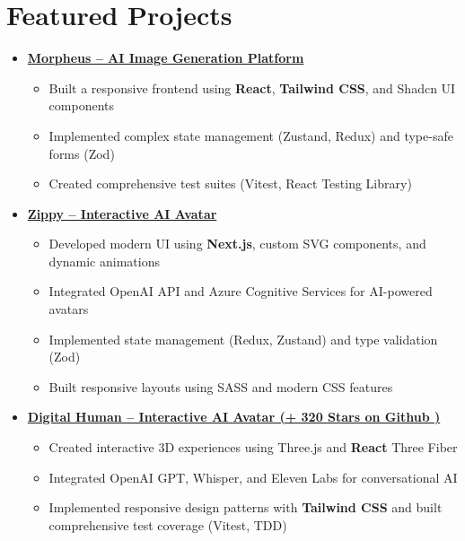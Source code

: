 \documentclass[letterpaper,11pt]{article}
\newcommand{\normalfaExternalLink}{{\mdseries\faExternalLink}}
\begin{document}
\section{Featured Projects}
\begin{itemize}[leftmargin=*]
    \item \textbf{\href{https://github.com/Monadical-SAS/Morpheus}{Morpheus -- AI Image Generation Platform \normalfaExternalLink}}
    \begin{itemize}
        \item Built a responsive frontend using \textbf{React}, \textbf{Tailwind CSS}, and Shadcn UI components
        \item Implemented complex state management (Zustand, Redux) and type-safe forms (Zod)
        \item Created comprehensive test suites (Vitest, React Testing Library)
    \end{itemize}
    
    \item \textbf{\href{https://github.com/asanchezyali/ai-avatar}{Zippy -- Interactive AI Avatar \normalfaExternalLink}}
    \begin{itemize}
        \item Developed modern UI using \textbf{Next.js}, custom SVG components, and dynamic animations
        \item Integrated OpenAI API and Azure Cognitive Services for AI-powered avatars
        \item Implemented state management (Redux, Zustand) and type validation (Zod)
        \item Built responsive layouts using SASS and modern CSS features
    \end{itemize}

    \item \textbf{\href{https://github.com/asanchezyali/talking-avatar-with-ai}{Digital Human -- Interactive AI Avatar (+
        320 Stars on Github )\normalfaExternalLink}}
    \begin{itemize}
        \item Created interactive 3D experiences using Three.js and \textbf{React} Three Fiber
        \item Integrated OpenAI GPT, Whisper, and Eleven Labs for conversational AI
        \item Implemented responsive design patterns with \textbf{Tailwind CSS} and built comprehensive test coverage (Vitest, TDD)
    \end{itemize}
\end{itemize}
\end{document}
